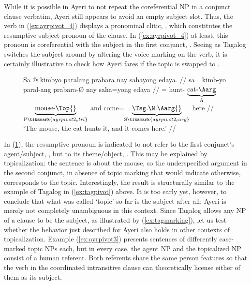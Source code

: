 While it is possible in Ayeri to not repeat the coreferential NP in a conjunct
clause verbatim, Ayeri still appears to avoid an empty subject slot. Thus, the
verb  in (\ref{ex:ayrpivot_4}) displays a
pronominal clitic, , which constitutes the resumptive
subject pronoun of the clause. In (\ref{ex:ayrpivot_4}) at least, this pronoun
is coreferential with the subject in the first conjunct,
. Seeing as Tagalog switches the subject around by
altering the voice marking on the verb, it is certainly illustrative to check
how Ayeri fares if the topic is swapped to .

\begin{figure}[h]
\ex\label{ex:ayrpivot2}
\begingl[aboveglftskip=1em]
	\gla Sa @ kimbyo paralang prabara nay sahayong edaya. //
	\glb sa= kimb-yo paral-ang prabara-Ø nay saha=yong edaya  //
	\glc \PatT{}= hunt-\TsgN{}
		$\underbrace{\text{cat-\Aarg}}_{\text{A}}$
		$\underbrace{\text{mouse-\Top{}}}_{\text{P}\tikzmark{ayrpivot2_ctrl}}$
		and
		come=$\underbrace{\text{\smash{\TsgN{}}.\Aarg{}}}_%
			{\text{S}\tikzmark{ayrpivot2_targ}}$
		here //
	\glft `The mouse, the cat hunts it, and it comes here.' //
\endgl

\xe
\end{figure}

In (\ref{ex:ayrpivot2}), the resumptive pronoun is indicated to not refer to
the first conjunct's agent/subject, , but to its
theme/object, . This may be explained by topicalization:
the sentence is about the mouse, so the underspecified argument in the second
conjunct, in absence of topic marking that would indicate otherwise,
corresponds to the topic. Interestingly, the result is structurally similar to
the example of Tagalog in (\ref{ex:tagpivot}) above. It is too early yet,
however, to conclude that what was called `topic' so far is the subject after
all; Ayeri is merely not completely unambiguous in this context. Since Tagalog
allows any NP of a clause to be the subject, as illustrated by
(\ref{ex:tagmarking}), let us test whether the behavior just described for
Ayeri also holds in other contexts of topicalization. Example 
(\ref{ex:ayrpivot3}) presents sentences of differently case-marked topic NPs
each, but in every case, the agent NP and the topicalized NP consist of a human
referent. Both referents share the same person features so that the verb in the
coordinated intransitive clause can theoretically license either of them as its
subject.

